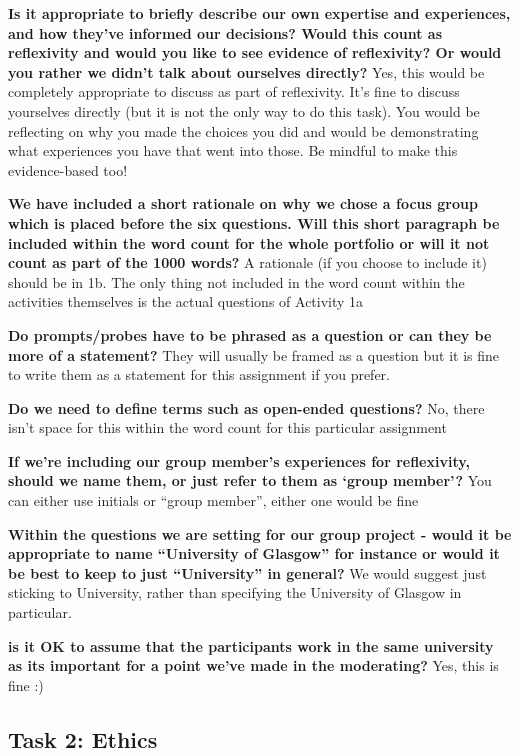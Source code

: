 \documentclass[
  english,
  letterpaper,
  DIV=11,
  numbers=noendperiod]{scrreprt}
\begin{document}
\textbf{Is it appropriate to briefly describe our own expertise and
experiences, and how they've informed our decisions? Would this count as
reflexivity and would you like to see evidence of reflexivity? Or would
you rather we didn't talk about ourselves directly?} Yes, this would be
completely appropriate to discuss as part of reflexivity. It's fine to
discuss yourselves directly (but it is not the only way to do this
task). You would be reflecting on why you made the choices you did and
would be demonstrating what experiences you have that went into those.
Be mindful to make this evidence-based too!

\textbf{We have included a short rationale on why we chose a focus group
which is placed before the six questions. Will this short paragraph be
included within the word count for the whole portfolio or will it not
count as part of the 1000 words?} A rationale (if you choose to include
it) should be in 1b. The only thing not included in the word count
within the activities themselves is the actual questions of Activity 1a

\textbf{Do prompts/probes have to be phrased as a question or can they
be more of a statement?} They will usually be framed as a question but
it is fine to write them as a statement for this assignment if you
prefer.

\textbf{Do we need to define terms such as open-ended questions?} No,
there isn't space for this within the word count for this particular
assignment

\textbf{If we're including our group member's experiences for
reflexivity, should we name them, or just refer to them as `group
member'?} You can either use initials or ``group member'', either one
would be fine

\textbf{Within the questions we are setting for our group project -
would it be appropriate to name ``University of Glasgow'' for instance
or would it be best to keep to just ``University'' in general?} We would
suggest just sticking to University, rather than specifying the
University of Glasgow in particular.

\textbf{is it OK to assume that the participants work in the same
university as its important for a point we've made in the moderating?}
Yes, this is fine :)

\subsection{Task 2: Ethics}\label{task-2-ethics-1}
\end{document}
